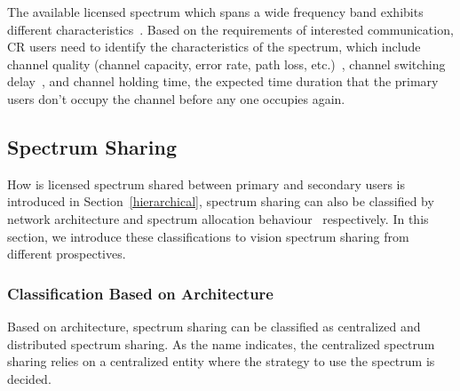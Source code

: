 The available licensed spectrum which spans a wide frequency band exhibits different characteristics~\cite{spectrum_decision_TMC11}.
Based on the requirements of interested communication, CR users need to identify the characteristics of the spectrum, which include channel quality (channel capacity, error rate, path loss, etc.)~\cite{spectrum_decision_TMC11}, channel switching delay~\cite{channel_switch_delay11}, and channel holding time, \ie the expected time duration that the primary users don't occupy the channel before any one occupies again.

\subsection{Spectrum Sharing}
How is licensed spectrum shared between primary and secondary users is introduced in Section~\ref{hierarchical}, spectrum sharing can also be classified by network architecture and spectrum allocation behaviour~\cite{Akyildiz09} respectively.
In this section, we introduce these classifications to vision spectrum sharing from different prospectives.
\subsubsection*{Classification Based on Architecture}
Based on architecture, spectrum sharing can be classified as centralized and distributed spectrum sharing.
As the name indicates, the centralized spectrum sharing relies on a centralized entity where the strategy to use the spectrum is decided. 

